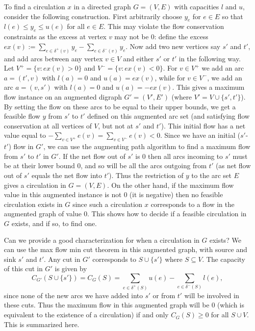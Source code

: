 \documentclass[12pt]{article}
\begin{document}
To find a circulation $x$ in a directed graph $G=(V,E)$ with capacities $l$ and $u$, consider the following construction. First arbitrarily choose $y_e$ for $e\in E$ so that $l(e)\leq y_e\leq u(e)$ for all $e\in E$. This may violate the flow conservation constraints as the excess at vertex $v$ may not be 0: define the excess $ex(v):=\sum_{e\in \delta^+(v)} y_e-\sum_{e\in \delta^-(v)} y_e$. Now add two new vertices say $s'$ and $t'$, and add arcs between any vertex $v\in V$ and either $s'$ or $t'$ in the following way. Let $V^+=\{v: ex(v)>0\}$ and $V^-=\{v: ex(v)<0\}$. For $v\in V^+$ we add an arc $a=(t',v)$ with $l(a)=0$ and $u(a)=ex(v)$, while for $v\in V^-$, we add an arc $a=(v,s')$ with $l(a)=0$ and $u(a)=-ex(v)$. This gives a maximum flow instance on an augmented digraph $G'=(V',E')$ (where $V'=V\cup\{s',t'\}$). By setting the flow on these arcs to be equal to their upper bounds, we get a feasible flow $y$ from $s'$ to $t'$ defined on this augmented arc set (and satisfying flow conservation at all vertices of $V$, but not at $s'$ and $t'$). This initial flow has a net value equal to $-\sum_{v\in V^+} e(v) =\sum_{v\in V^-} e(v) <0$. Since we have an initial ($s'$-$t'$) flow in $G'$, we can use the augmenting path algorithm to find a maximum flow from $s'$ to $t'$ in $G'$. If the net flow out of $s'$ is 0 then all arcs incoming to $s'$ must be at their lower bound 0, and so will be all the arcs outgoing from $t'$ (as net flow out of $s'$ equals the net flow into $t'$). Thus the restriction of $y$ to the arc set $E$ gives a circulation in $G=(V,E)$. On the other hand, if the maximum flow value in this augmented instance is not 0 (it is negative) then no feasible circulation exists in $G$ since such a circulation $x$ corresponds to a flow in the augmented graph of value 0. This shows how to decide if a feasible circulation in $G$ exists, and if so, to find one. 

Can we provide a good characterization for when a circulation in $G$ exists? We can use the max flow min cut theorem in this augmented graph, with source and sink $s'$ and $t'$. Any cut in $G'$ corresponds to $S\cup\{s'\}$ where $S\subseteq V$. The capacity of this cut in $G'$ is given by $$C_{G'}(S\cup \{s'\})=C_G(S)=\sum_{e\in \delta^+(S)} u(e) - \sum_{e\in \delta^-(S)} l(e),$$ since none of the new arcs we have added into $s'$ or from $t'$ will be involved in these cuts. Thus the maximum flow in this augmented graph will be 0 (which is equivalent to the existence of a circulation) if and only $C_G(S) \geq 0$ for all $S\cup V$. This is summarized here. 
\end{document}
